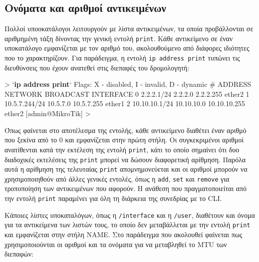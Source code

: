 \documentclass{EdipyLabs} %
\begin{document}
\subsection{Ονόματα και αριθμοί αντικειμένων}
Πολλοί υποοκατάλογοι λειτουργούν με λίστα αντικειμένων, τα οποία προβάλλονται σε αριθμημένη τάξη δίνοντας την γενική εντολή \texttt{print}. Κάθε αντικείμενο σε έναν υποκατάλογο εμφανίζεται με τον αριθμό του, ακολουθούμενο από διάφορες ιδιότητες που το χαρακτηρίζουν. Για παράδειγμα, η εντολή \texttt{ip address print} τυπώνει τις διευθύνσεις που έχουν ανατεθεί στις διεπαφές του δρομολογητή:

\begin{CommandBox}
 > `\textbf{ip address print}`
Flags: X - disabled, I - invalid, D - dynamic
#   ADDRESS            NETWORK         BROADCAST       INTERFACE
0   2.2.2.1/24         2.2.2.0         2.2.2.255       ether2
1   10.5.7.244/24      10.5.7.0        10.5.7.255      ether1
2   10.10.10.1/24      10.10.10.0      10.10.10.255    ether2
[admin@MikroTik] > 
\end{CommandBox}

Όπως φαίνεται στο αποτέλεσμα της εντολής, κάθε αντικείμενο διαθέτει έναν αριθμό που ξεκίνα από το 0 και εμφανίζεται στην πρώτη στήλη. Οι συγκεκριμένοι αριθμοί ανατίθενται κατά την εκτέλεση της εντολή \texttt{print}, κάτι το οποίο σημαίνει ότι δυο διαδοχικές εκτελέσεις της \texttt{print} μπορεί να δώσουν διαφορετική αρίθμηση. Παρόλα αυτά η αρίθμηση της τελευταίας \texttt{print} απομνημονεύεται και οι αριθμοί μπορούν να χρησιμοποιηθούν από άλλες γενικές εντολές, όπως η \texttt{add}, \texttt{set} και \texttt{remove} για τροποποίηση των αντικειμένων που αφορούν. H ανάθεση που πραγματοποιείται από την εντολή \texttt{print} παραμένει για όλη τη διάρκεια της συνεδρίας με το CLI.

Κάποιες λίστες υποκαταλόγων, όπως η \texttt{/interface} και η \texttt{/user}, διαθέτουν και όνομα για τα αντικείμενα των λιστών τους, το οποίο δεν μεταβάλλεται με την εντολή \texttt{print} και εμφανίζεται στην στήλη NAME. Στο παράδειγμα που ακολουθεί φαίνεται πως χρησιμοποιούνται οι αριθμοί και τα ονόματα για να μεταβληθεί το MTU των διεπαφών:
\end{document}

